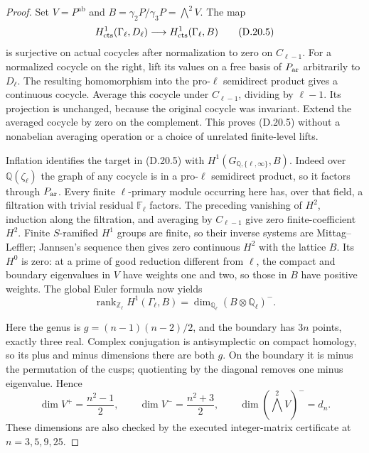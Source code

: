 \begin{proof}
Set \(V=P^{\mathrm{ab}}\) and
\(B=\gamma_2P/\gamma_3P=\bigwedge^2 V\).
The map
\[
 H^1_{\rm cts}(\Gamma_\ell,D_\ell)
       \longrightarrow H^1_{\rm cts}(\Gamma_\ell,B)
                                                               \tag{D.20.5}
\]
is surjective on actual cocycles after normalization
to zero on \(C_{\ell-1}\). For a normalized cocycle
on the right, lift its values on a free basis of
\(P_{\rm ar}\) arbitrarily to \(D_\ell\).
The resulting homomorphism into the pro-\(\ell\)
semidirect product gives a continuous cocycle.
Average this cocycle under \(C_{\ell-1}\), dividing
by \(\ell-1\). Its projection is unchanged, because
the original cocycle was invariant. Extend the
averaged cocycle by zero on the complement.
This proves (D.20.5) without a nonabelian averaging
operation or a choice of unrelated finite-level lifts.

Inflation identifies the target in (D.20.5) with
\(H^1(G_{\mathbb Q,\{\ell,\infty\}},B)\).
Indeed over \(\mathbb Q(\zeta_\ell)\) the graph of
any cocycle is in a pro-\(\ell\) semidirect product,
so it factors through \(P_{\rm ar}\). Every finite
\(\ell\)-primary module occurring here has, over
that field, a filtration with trivial residual
\(\mathbb F_\ell\) factors. The preceding vanishing
of \(H^2\), induction along the filtration, and
averaging by \(C_{\ell-1}\) give zero finite-coefficient
\(H^2\). Finite \(S\)-ramified \(H^1\) groups are
finite, so their inverse systems are Mittag--Leffler;
Jannsen's sequence then gives zero continuous
\(H^2\) with the lattice \(B\). Its \(H^0\) is zero:
at a prime of good reduction different from \(\ell\),
the compact and boundary eigenvalues in \(V\) have
weights one and two, so those in \(B\) have positive
weights. The global Euler formula
\cite[Chapter I, \S4]{DE_MilneADT} now yields
\[
 \operatorname{rank}_{\mathbb Z_\ell}H^1(\Gamma_\ell,B)
       =\dim_{\mathbb Q_\ell}(B\otimes\mathbb Q_\ell)^-.
                                                               \tag{D.20.6}
\]

Here the genus is \(g=(n-1)(n-2)/2\), and the
boundary has \(3n\) points, exactly three real.
Complex conjugation is antisymplectic on compact
homology, so its plus and minus dimensions there
are both \(g\). On the boundary it is minus the
permutation of the cusps; quotienting by the
diagonal removes one minus eigenvalue. Hence
\[
 \dim V^+=\frac{n^2-1}{2},\qquad
 \dim V^-=\frac{n^2+3}{2},\qquad
 \dim(\bigwedge^2V)^-=d_n.                            \tag{D.20.7}
\]
These dimensions are also checked by the executed
integer-matrix certificate
 at \(n=3,5,9,25\).


\end{proof}
